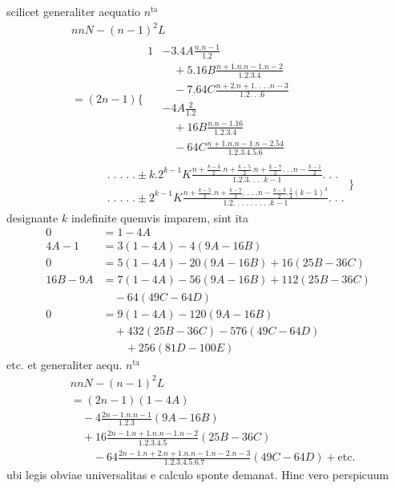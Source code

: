 scilicet generaliter aequatio \(n^{\mathrm{ta}}\)
\[
\begin{aligned}
&nnN-(n-1)^2L\\[6pt]
&=(2n-1)\Biggl\{\begin{aligned}
1&-3.4A\frac{n. n-1}{1.2}
\\&\quad+5.16B\frac{n+1. n. n-1. n-2}{1.2.3.4}
\\&\quad-7.64C\frac{n+2. n+1.\;.\;.\;. n-3}{1.2.\;.\;.6}\\[6pt]
&-4A\frac{2}{1.2}
\\&\quad+16B\frac{n. n-1.16}{1.2.3.4}
\\&\quad-64C\frac{n+1. n. n-1. n-2.54}{1.2.3.4.5.6}
\end{aligned}\\[6pt]
&\qquad\begin{aligned}
&.\;.\;.\;.\;.\pm k.2^{k-1}K
\frac{n+\frac{k-3}{2}. n+\frac{k-5}{2}. n+\frac{k-7}{2}.\;.\;. n-\frac{k-1}{2}}
{1.2.3.\;.\;.\;. k-1}.\;.\;.\\[6pt]
&.\;.\;.\;.\;.\pm 2^{k-1}K
\frac{n+\frac{k-5}{2}. n+\frac{k-7}{2}.\;.\;.\;. n-\frac{k-3}{2}.\frac14(k-1)^3}
{1.2.\;.\;.\;.\;.\;.\;.\;.\;. k-1}.\;.\;.
\end{aligned}\Biggr\}
\end{aligned}
\]
designante \(k\) indefinite quemvis imparem, sint ita
\[
\begin{aligned}
0&=1-4A\\[6pt]
4A-1&=3(1-4A)-4(9A-16B)\\[6pt]
0&=5(1-4A)-20(9A-16B)+16(25B-36C)\\[6pt]
16B-9A&=7(1-4A)-56(9A-16B)+112(25B-36C)\\&\quad-64(49C-64D)\\[6pt]
0&=9(1-4A)-120(9A-16B)\\&\quad+432(25B-36C)-576(49C-64D)\\[6pt]
&\qquad+256(81D-100E)
\end{aligned}
\]
etc. et generaliter aequ. \(n^{\mathrm{ta}}\)
\[
\begin{aligned}
&nnN-(n-1)^2L\\[6pt]
&=(2n-1)(1-4A)\\&\quad-4\frac{2n-1. n. n-1}{1.2.3}(9A-16B)\\&\quad+16\frac{2n-1. n+1. n. n-1. n-2}{1.2.3.4.5}(25B-36C)\\[6pt]
&\qquad-64\frac{2n-1. n+2. n+1. n. n-1. n-2. n-3}{1.2.3.4.5.6.7}(49C-64D)+\text{etc.}
\end{aligned}
\]
ubi legis obviae universalitas e calculo sponte demanat. Hinc vero perspicuum
